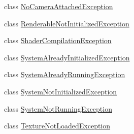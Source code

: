 \begin{DoxyCompactItemize}
\item 
class \hyperlink{class_exceptions_1_1_no_camera_attached_exception}{No\+Camera\+Attached\+Exception}
\item 
class \hyperlink{class_exceptions_1_1_renderable_not_initialized_exception}{Renderable\+Not\+Initialized\+Exception}
\item 
class \hyperlink{class_exceptions_1_1_shader_compilation_exception}{Shader\+Compilation\+Exception}
\item 
class \hyperlink{class_exceptions_1_1_system_already_initialized_exception}{System\+Already\+Initialized\+Exception}
\item 
class \hyperlink{class_exceptions_1_1_system_already_running_exception}{System\+Already\+Running\+Exception}
\item 
class \hyperlink{class_exceptions_1_1_system_not_initialized_exception}{System\+Not\+Initialized\+Exception}
\item 
class \hyperlink{class_exceptions_1_1_system_not_running_exception}{System\+Not\+Running\+Exception}
\item 
class \hyperlink{class_exceptions_1_1_texture_not_loaded_exception}{Texture\+Not\+Loaded\+Exception}
\end{DoxyCompactItemize}
